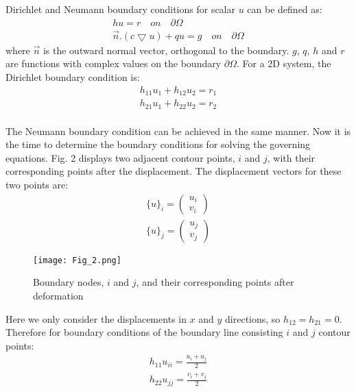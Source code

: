 \documentclass{jicspack}
\begin{document}
Dirichlet and Neumann boundary conditions for scalar $u$ can be defined as: 
\begin{equation}
\begin{split}
hu=r \quad on \quad \partial \Omega \\
\overrightarrow{n}.(c\bigtriangledown u)+qu=g \quad on \quad \partial \Omega
\end{split}
\end{equation}
where $\overrightarrow{n}$  is the outward normal vector, orthogonal to the boundary. $g$, $q$, $h$ and $r$ are functions with complex values on the boundary $\partial \Omega$. For a 2D system, the Dirichlet boundary condition is: 
\begin{equation}
\begin{split}
h_{11}u_1+h_{12}u_2=r_1\\
h_{21}u_1+h_{22}u_2=r_2\\
\end{split}
\end{equation}

The Neumann boundary condition can be achieved in the same manner. Now it is the time to determine the boundary conditions for solving the governing equations. Fig. 2 displays two adjacent contour points, $i$ and $j$, with their corresponding points after the displacement. The displacement vectors for these two points are: 
\begin{equation}
\begin{split}
\{u\}_i=\begin{pmatrix}
u_i \\ v_i
\end{pmatrix} \\
\{u\}_j=\begin{pmatrix}
u_j \\ v_j
\end{pmatrix}
\end{split}
\end{equation}

\begin{figure}
\centering
\texttt{[image: Fig\_2.png]}
\caption{Boundary nodes, $i$ and $j$, and their corresponding points after deformation}
\end{figure}

Here we only consider the displacements in $x$ and $y$ directions, so $h_{12}=h_{21}=0$. Therefore for boundary conditions of the boundary line consisting $i$ and $j$ contour points: 
\begin{equation}
\begin{split}
h_{11}u_{ii}=\frac{u_i+u_j}{2}\\
h_{22}u_{jj}=\frac{v_i+v_j}{2}
\end{split}
\end{equation}
\end{document}
